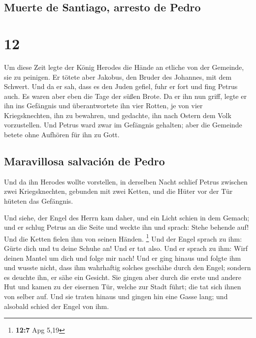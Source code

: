 \hypertarget{muerte-de-santiago-arresto-de-pedro}{%
\subsection{Muerte de Santiago, arresto de
Pedro}\label{muerte-de-santiago-arresto-de-pedro}}

\hypertarget{section-11}{%
\section{12}\label{section-11}}

 Um diese Zeit legte der König Herodes die Hände an
etliche von der Gemeinde, sie zu peinigen.  Er tötete aber
Jakobus, den Bruder des Johannes, mit dem Schwert.  Und da
er sah, dass es den Juden gefiel, fuhr er fort und fing Petrus auch. Es
waren aber eben die Tage der süßen Brote.  Da er ihn nun
griff, legte er ihn ins Gefängnis und überantwortete ihn vier Rotten, je
von vier Kriegsknechten, ihn zu bewahren, und gedachte, ihn nach Ostern
dem Volk vorzustellen.  Und Petrus ward zwar im Gefängnis
gehalten; aber die Gemeinde betete ohne Aufhören für ihn zu Gott.

\hypertarget{maravillosa-salvaciuxf3n-de-pedro}{%
\subsection{Maravillosa salvación de
Pedro}\label{maravillosa-salvaciuxf3n-de-pedro}}

 Und da ihn Herodes wollte vorstellen, in derselben Nacht
schlief Petrus zwischen zwei Kriegsknechten, gebunden mit zwei Ketten,
und die Hüter vor der Tür hüteten das Gefängnis.

 Und siehe, der Engel des Herrn kam daher, und ein Licht
schien in dem Gemach; und er schlug Petrus an die Seite und weckte ihn
und sprach: Stehe behende auf! Und die Ketten fielen ihm von seinen
Händen. \footnote{\textbf{12:7} Apg 5,19}  Und der Engel
sprach zu ihm: Gürte dich und tu deine Schuhe an! Und er tat also. Und
er sprach zu ihm: Wirf deinen Mantel um dich und folge mir nach!
 Und er ging hinaus und folgte ihm und wusste nicht, dass
ihm wahrhaftig solches geschähe durch den Engel; sondern es deuchte ihn,
er sähe ein Gesicht.  Sie gingen aber durch die erste und
andere Hut und kamen zu der eisernen Tür, welche zur Stadt führt; die
tat sich ihnen von selber auf. Und sie traten hinaus und gingen hin eine
Gasse lang; und alsobald schied der Engel von ihm.

